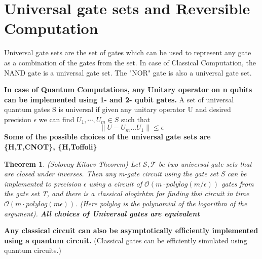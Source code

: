 \documentclass[12pt, oneside]{book}
\newtheorem{theorem}{Theorem}[section]
\theoremstyle{definition}
\theoremstyle{definition}
\theoremstyle{remark}
\begin{document}
\section{Universal gate sets and Reversible Computation}
Universal gate sets are the set of gates which can be used to represent any gate as a combination of the gates from the set.
In case of Classical Computation, the NAND gate is a universal gate set. The "NOR" gate is also a universal gate set.
 
\textbf{In case of Quantum Computations, any Unitary operator on n qubits can be implemented using
1- and 2- qubit gates.} A set of universal quantum gates S is universal if given any unitary operator U and desired precision $\epsilon$ we can
find $U_1,\cdots, U_m \in S$ such that
\[\|U-U_m\ldots U_1\| \leq \epsilon\]
\textbf{Some of the possible choices of the universal gate sets are \{H,T,CNOT\}, \{H,Toffoli\}}
 
\begin{theorem}
    \textit{(Solovay-Kitaev Theorem)} Let $\mathcal{S}, \mathcal{T}$ be two universal gate sets
    that are closed under inverses. Then any m-gate circuit using the gate set S can be implemented to precision
    $\epsilon$ using a circuit of $\mathcal{O}(m\cdot polylog(m/\epsilon))$ gates from the gate set T, and there is
    a classical alogirhtm for finding thsi circuit in time $\mathcal{O}(m\cdot polylog(m\epsilon))$. (Here polylog is the
    polynomial of the logarithm of the argument). \textbf{All choices of Universal gates are equivalent}
\end{theorem}
 
\textbf{Any classical circuit can also be asymptotically efficiently implemented using a quantum circuit.} (Classical gates can be efficiently
simulated using quantum circuits.)
 
\end{document}
